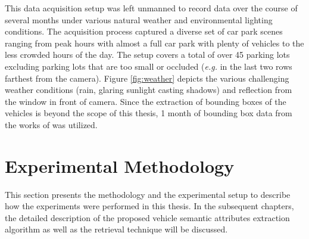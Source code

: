 This data acquisition setup was left unmanned to record data over the course of several months under various natural weather and environmental lighting conditions. The acquisition process captured a diverse set of car park scenes ranging from peak hours with almost a full car park with plenty of vehicles to the less crowded hours of the day. 
The setup covers a total of over 45 parking lots excluding parking lots that are too small or occluded (\emph{e.g.} in the last two rows farthest from the camera). Figure \ref{fig:weather} depicts the various challenging weather conditions (rain, glaring sunlight casting shadows) and reflection from the window in front of camera. 
Since the extraction of bounding boxes of the vehicles is beyond the scope of this thesis, 1 month of bounding box data from the works of \cite{lim2017} was utilized.  

\section{Experimental Methodology}
\label{sec:expmethodology}

This section presents the methodology and the experimental setup to describe how the experiments were performed in this thesis.
In the subsequent chapters, the detailed description of the proposed vehicle semantic attributes extraction algorithm as well as the retrieval technique will be discussed. 

